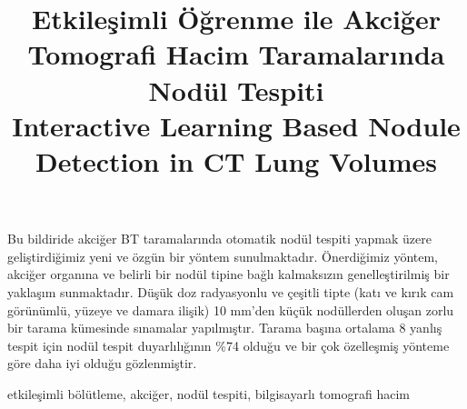 \documentclass[conference]{IEEEtran}
\begin{document}

%
\title{Etkileşimli Öğrenme ile Akciğer Tomografi Hacim Taramalarında Nodül Tespiti\\
Interactive Learning Based Nodule Detection in CT Lung Volumes}

\author{
}


%




\maketitle

\begin{ozet}
Bu bildiride akciğer BT taramalarında otomatik nodül tespiti yapmak üzere geliştirdiğimiz yeni ve özgün bir yöntem sunulmaktadır. Önerdiğimiz yöntem, akciğer organına ve belirli bir nodül tipine bağlı kalmaksızın genelleştirilmiş bir yaklaşım sunmaktadır. Düşük doz radyasyonlu ve çeşitli tipte (katı ve kırık cam görünümlü, yüzeye ve damara ilişik) 10 mm'den küçük nodüllerden oluşan zorlu bir tarama kümesinde sınamalar yapılmıştır. Tarama başına ortalama 8 yanlış tespit için nodül tespit duyarlılığının \%74 olduğu ve bir çok özelleşmiş yönteme göre daha iyi olduğu gözlenmiştir.

\end{ozet}
\begin{IEEEanahtar}
etkileşimli bölütleme, akciğer, nodül tespiti, bilgisayarlı tomografi hacim
\end{IEEEanahtar}
\end{document}
